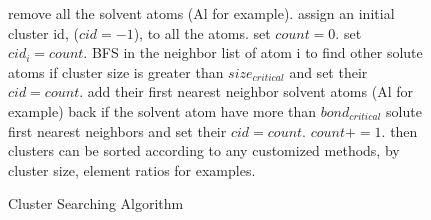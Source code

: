 \begin{figure}[!htb]
  \centering
  \begin{minipage}{.75\linewidth}
    \begin{algorithm}[H]
      \caption{Cluster Searching Algorithm}\label{algo:cluster}
      \begin{algorithmic}[1]
        \State remove all the solvent atoms (Al for example).
        \State assign an initial cluster id, ($cid = -1$), to all the atoms.
        \State set $count = 0$.
            \State set $cid_i = count$.
            \State \ac{BFS} in the neighbor list of atom i to find other solute atoms if cluster size is greater than $size_{critical}$ and set their $cid = count$.
            \State add their first nearest neighbor solvent atoms (Al for example) back if the solvent atom have more than $bond_{critical}$ solute first nearest neighbors and set their $cid = count$.
            \State $count += 1$.
          \EndIf
        \EndFor
        \State then clusters can be sorted according to any customized methods, by cluster size, element ratios for examples.
      \end{algorithmic}
    \end{algorithm}
  \end{minipage}
\end{figure}


